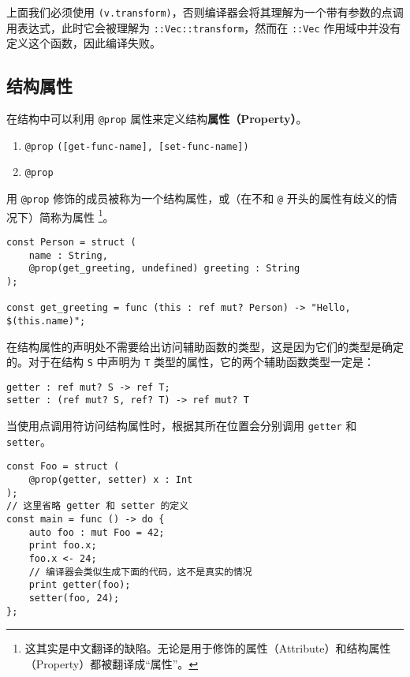 上面我们必须使用 \lstinline!(v.transform)!，否则编译器会将其理解为一个带有参数的点调用表达式，此时它会被理解为 \lstinline!::Vec::transform!，然而在 \lstinline!::Vec! 作用域中并没有定义这个函数，因此编译失败。 \\

\subsection{结构属性}

在结构中可以利用 \lstinline!@prop! 属性来定义结构\textbf{属性（Property）}。

\begin{grammar} \label{grm:structure-property}
\begin{enumerate}
	\item \lstinline!@prop! \texttt{([get-func-name], [set-func-name])}
	\item \lstinline!@prop!
\end{enumerate}
\end{grammar}

用 \lstinline!@prop! 修饰的成员被称为一个结构属性，或（在不和 \lstinline!@! 开头的属性有歧义的情况下）简称为属性 \footnote{这其实是中文翻译的缺陷。无论是用于修饰的属性（Attribute）和结构属性（Property）都被翻译成“属性”。}。

\begin{lstlisting}
const Person = struct (
	name : String,
	@prop(get_greeting, undefined) greeting : String
);

const get_greeting = func (this : ref mut? Person) -> "Hello, $(this.name)";
\end{lstlisting}

在结构属性的声明处不需要给出访问辅助函数的类型，这是因为它们的类型是确定的。对于在结构 \lstinline!S! 中声明为 \lstinline!T! 类型的属性，它的两个辅助函数类型一定是：

\begin{lstlisting}
getter : ref mut? S -> ref T;
setter : (ref mut? S, ref? T) -> ref mut? T
\end{lstlisting}

当使用点调用符访问结构属性时，根据其所在位置会分别调用 \lstinline!getter! 和 \lstinline!setter!。

\begin{lstlisting}
const Foo = struct (
	@prop(getter, setter) x : Int
);
// 这里省略 getter 和 setter 的定义
const main = func () -> do {
	auto foo : mut Foo = 42;
	print foo.x;
	foo.x <- 24;
	// 编译器会类似生成下面的代码，这不是真实的情况
	print getter(foo);
	setter(foo, 24);
};
\end{lstlisting}

